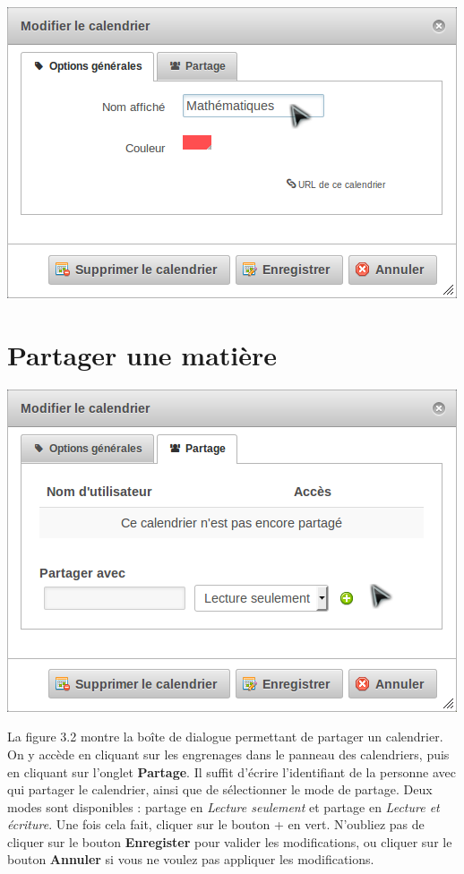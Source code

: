\documentclass[a4paper, 11pt]{report}
\begin{document}
			\begin{center}
				\includegraphics[scale = 0.7]{modifier_calendrier.png}
			\end{center}

		\section{\og Partager \fg{} une matière}
			\begin{center}
				\includegraphics[scale = 0.7]{partager_calendrier.png}
			\end{center}

			La figure 3.2 montre la boîte de dialogue permettant de partager un calendrier. On y accède en cliquant sur les engrenages dans le panneau des calendriers, puis en cliquant sur l’onglet \textbf{Partage}. Il suffit d’écrire l’identifiant de la personne avec qui partager le calendrier, ainsi que de sélectionner le mode de partage. Deux modes sont disponibles : partage en \textit{Lecture seulement} et partage en \textit{Lecture et écriture}. Une fois cela fait, cliquer sur le bouton + en vert. N’oubliez pas de cliquer sur le bouton \textbf{Enregister} pour valider les modifications, ou cliquer sur le bouton \textbf{Annuler} si vous ne voulez pas appliquer les modifications.
\end{document}
